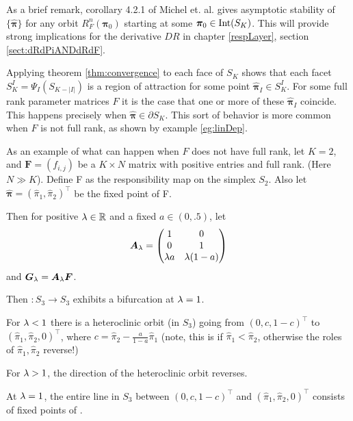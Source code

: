 As a brief remark, corollary 4.2.1 of Michel et. al. \cite{michel2015stability} gives asymptotic stability of \( \{\hat{\bm \pi}\} \) for any orbit \( R_F^n(\bm\pi_0) \) starting at some \( \bm\pi_0\in\operatorname{Int}(S_K) \). This will provide strong implications for the derivative \( DR \) in chapter \ref{respLayer}, section \ref{sect:dRdPiANDdRdF}.

Applying theorem \ref{thm:convergence} to each face of \( S_K \) shows that each facet \( S_K^I = \Psi_I(S_{K-|I|}) \) is a region of attraction for some point \( \hat{\bm \pi}_I \in S_K^I\).  For some full rank parameter matrices \( F \) it is the case that one or more of these \( \hat{\bm \pi}_I \) coincide.  This happens precisely when \( \hat{\bm\pi}\in \partial S_K \). This sort of behavior is more common when \( F \) is not full rank, as shown by example \ref{eg:linDep}.

\begin{eg}\label{eg:linDep}
	As an example of what can happen when $F$ does not have full rank, let \(K=2\), and \(\bm{F}=(f_{i,j})\) be a \(K\times N\) matrix with positive entries and full rank. (Here \(N \gg K\)).  Define \Rpi F as the responsibility map on  the simplex \( S_2 \). Also let \(\hat{\bm{\pi}}=(\hat{\pi}_1,\hat{\pi}_2)^\intercal\) be the fixed point of \Rpi F.
	
	Then for positive $\lambda\in\mathbb R$ and a fixed $a\in(0,.5)$, let 	
	\[\bm A_{\lambda}=\begin{pmatrix}
	1 & 0\\
	0 & 1\\
	\lambda a & \lambda(1-a)\\
	\end{pmatrix}\]
	and $\bm G_{\lambda}=\bm A_{\lambda}\bm F$.
	
	Then \( :S_3\rightarrow S_3 \) exhibits a bifurcation at $\lambda=1$.
	
	For $\lambda<1$ there is a heteroclinic orbit (in $S_3$) going from $(0,c,1-c)^{\intercal}$ to $(\hat{\pi}_1,\hat{\pi}_2,0)^\intercal$, where $c=\hat{\pi}_2-\frac{a}{1-a}\hat{\pi}_1$ (note, this is if $\hat{\pi}_1<\hat{\pi}_2$, otherwise the roles of $\hat{\pi}_1,\hat{\pi}_2$ reverse!)
	
	For $\lambda>1$, the direction of the heteroclinic orbit reverses.
	
	At $\lambda=1$, the entire line in $S_3$ between $(0,c,1-c)^{\intercal}$ and $(\hat{\pi}_1,\hat{\pi}_2,0)^\intercal$ consists of fixed points of .
	
\end{eg}

